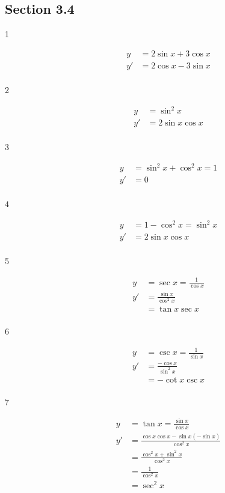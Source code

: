 \documentclass{exam}
\begin{document}
\subsection{Section 3.4}

\begin{description}

\item[1]
\begin{align*}
  y  &= 2 \sin x + 3 \cos x \\
  y' &= 2 \cos x - 3 \sin x \\ 
\end{align*}

\item[2]
\begin{align*}
  y  &= \sin^2 x \\
  y' &= 2 \sin x \cos x \\ 
\end{align*}

\item[3]
\begin{align*}
  y  &= \sin^2 x + \cos^2 x = 1 \\
  y' &= 0 \\ 
\end{align*}

\item[4]
\begin{align*}
  y  &= 1 - \cos^2 x = \sin^2 x \\
  y' &= 2 \sin x \cos x \\ 
\end{align*}

\item[5]
\begin{align*}
  y  &= \sec x = \frac{1}{\cos x} \\
  y' &= \frac{\sin x}{\cos^2 x} \\ 
     &= \tan x \sec x \\
\end{align*}

\item[6]
\begin{align*}
  y  &= \csc x = \frac{1}{\sin x} \\
  y' &= \frac{- \cos x}{\sin^2 x} \\ 
     &= - \cot x \csc x \\
\end{align*}

\item[7]
\begin{align*}
  y  &= \tan x = \frac{\sin x}{\cos x} \\
  y' &= \frac{\cos x \cos x - \sin x (-\sin x)}{\cos^2 x} \\ 
     &= \frac{\cos^2 x + \sin^2 x}{\cos^2 x} \\ 
     &= \frac{1}{\cos^2 x} \\ 
     &= \sec^2 x \\
\end{align*}


\end{description}
\end{document}
